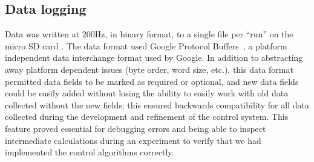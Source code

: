 \subsection{Data logging} \label{rb:subsec:data}
Data was written at 200Hz, in binary format, to a single file per ``run'' on
the micro SD card . The data format used Google Protocol
Buffers~\cite{GoogleProtoBuf}, a platform independent data interchange format
used by Google. In addition to abstracting away platform dependent issues (byte
order, word size, etc.), this data format permitted data fields to be marked as
required or optional, and new data fields could be easily added without losing
the ability to easily work with old data collected without the new fields; this
ensured backwards compatibility for all data collected during the development
and refinement of the control system. This feature proved essential for
debugging errors and being able to inspect intermediate calculations during an
experiment to verify that we had implemented the control algorithms correctly.


